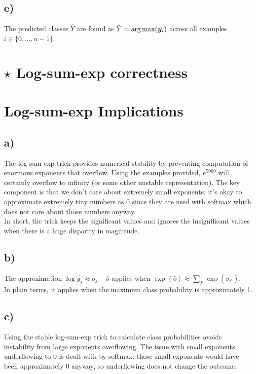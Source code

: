 \documentclass{article}
\renewcommand{\vec}[1]{%
	\bm{#1}%
}
\begin{document}
	\subsection*{e)}
	The predicted classes $\hat{Y}$ are found as $\hat{Y} = \arg\max(\hat{\vec{y}_i})$ across all examples $i \in \{0,...,n-1\}$.
	
	\section{$\star$ Log-sum-exp correctness}
	
	
	\section{Log-sum-exp Implications}
	\subsection*{a)}
	The log-sum-exp trick provides numerical stability by preventing computation of enormous exponents that overflow. Using the examples provided, $e^{5000}$ will certainly overflow to infinity (or some other unstable representation). The key component is that we don't care about extremely small exponents; it's okay to approximate extremely tiny numbers as 0 since they are used with softmax which does not care about those numbers anyway.\\
	In short, the trick keeps the significant values and ignores the insignificant values when there is a huge disparity in magnitude.
	
	\subsection*{b)}
	The approximation $\log \hat{y_j} \approx o_j - \bar{o}$ applies when $\exp(\bar{o}) \approx \sum_{j'} \exp(o_{j'})$.\\
	In plain terms, it applies when the maximum class probability is approximately 1.
	
	\subsection*{c)}
	Using the stable log-sum-exp trick to calculate class probabilities avoids instability from large exponents overflowing. The issue with small exponents underflowing to 0 is dealt with by softmax: those small exponents would have been approximately 0 anyway, so underflowing does not change the outcome.
	
\end{document}
